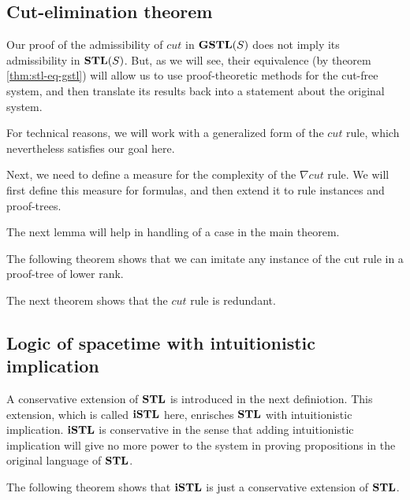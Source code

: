 \documentclass[12pt,a4paper]{article}
\begin{document}


\subsection{Cut-elimination theorem}
Our proof of the admissibility of $cut$ in $\mathbf{GSTL}(S)$ does not imply its admissibility in $\mathbf{STL}(S)$. But, as we will see, their equivalence (by theorem \ref{thm:stl-eq-gstl}) will allow us to use proof-theoretic methods for the cut-free system, and then translate its results back into a statement about the original system.

For technical reasons, we will work with a generalized form of the $cut$ rule, which nevertheless satisfies our goal here.





Next, we need to define a measure for the complexity of the $\nabla cut$ rule. We will first define this measure for formulas, and then extend it to rule instances and proof-trees.



The next lemma will help in handling of a case in the main theorem.



The following theorem shows that we can imitate any instance of the cut rule in a proof-tree of lower rank.



The next theorem shows that the $cut$ rule is redundant.



\subsection{Logic of spacetime with intuitionistic implication}
A conservative extension of $\mathbf{STL}$ is introduced in the next definiotion. This extension, which is called $\mathbf{iSTL}$ here, enrisches $\mathbf{STL}$ with intuitionistic implication. $\mathbf{iSTL}$ is conservative in the sense that adding intuitionistic implication will give no more power to the system in proving propositions in the original language of $\mathbf{STL}$.



The following theorem shows that $\mathbf{iSTL}$ is just a conservative extension of $\mathbf{STL}$.


\end{document}
